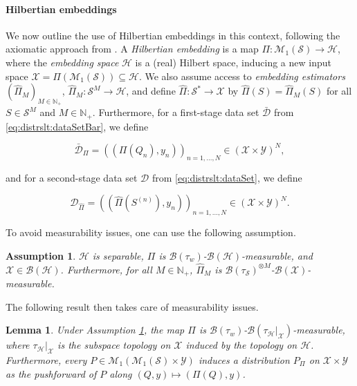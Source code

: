 \documentclass[letterpaper]{article} %
\newcommand{\Np}{\mathbb{N}_+}
\newcommand{\Borel}{\mathcal{B}} %
\newcommand{\hs}[1]{\mathcal{#1}} %
\newcommand{\samplingSet}{\mathcal{S}} %
\newcommand{\inputSet}{\mathcal{X}} %
\newcommand{\outputSet}{\mathcal{Y}} %
\newcommand{\dataSet}{\mathcal{D}}
\newcommand{\dataSetBar}{\bar{\dataSet}}
\newcommand{\distributions}{\mathcal{M}_1} %
\newcommand{\hilbertianHS}{\hs{H}} %
\newcommand{\hilbertianEmbed}{\Pi} %
\newcommand{\defm}[1]{\emph{#1}}
\newtheorem{lemma}[theorem]{Lemma}
\newtheorem{assumption}[theorem]{Assumption}
\newif\ifNotMuchSpace
\begin{document}
\paragraph{Hilbertian embeddings}
We now outline the use of Hilbertian embeddings in this context, following the axiomatic approach from \cite{fiedler2024statistical}.
A \defm{Hilbertian embedding} is a map  $\hilbertianEmbed: \distributions(\samplingSet) \rightarrow \hilbertianHS$,
where the \defm{embedding space } $\hilbertianHS$ is a (real) Hilbert space,
inducing a new input space $\inputSet=\hilbertianEmbed(\distributions(\samplingSet))\subseteq\hilbertianHS$.
We also assume access to \defm{embedding estimators} $(\hat\hilbertianEmbed_M)_{M\in\Np}$, $\hat\hilbertianEmbed_M: \samplingSet^M \rightarrow \hilbertianHS$,
and define $\hat\hilbertianEmbed: \samplingSet^\ast \rightarrow \inputSet$  by $\hat\hilbertianEmbed(S)=\hat\hilbertianEmbed_M(S)$ for all $S\in\samplingSet^M$ and $M\in\Np$.
Furthermore, for a first-stage data set $\dataSetBar$ from \eqref{eq:distrslt:dataSetBar}, we define
\ifNotMuchSpace
$\dataSetBar_\hilbertianEmbed = \big((\hilbertianEmbed (Q_n), y_n)\big)_{n=1,\ldots,N} \in (\inputSet\times\outputSet)^N$,
\else
\begin{equation*}
     \dataSetBar_\hilbertianEmbed = \left((\hilbertianEmbed (Q_n), y_n)\right)_{n=1,\ldots,N} \in (\inputSet\times\outputSet)^N,
\end{equation*}
\fi
and for a second-stage data set $\dataSet$ from \eqref{eq:distrslt:dataSet}, we define
\ifNotMuchSpace
$\dataSet_{\hat\hilbertianEmbed} = \big((\hat\hilbertianEmbed(S^{(n)}),y_n)\big)_{n=1,\ldots,N}$.
\else
\begin{equation*}
     \dataSet_{\hat\hilbertianEmbed} = \left((\hat\hilbertianEmbed(S^{(n)}),y_n)\right)_{n=1,\ldots,N} \in (\inputSet\times\outputSet)^N.
\end{equation*}
\fi
To avoid measurability issues, one can use the following assumption.
\begin{assumption}\label{assumption:distrslt:sufficientConditionMeasurability}
$\hilbertianHS$ is separable, 
$\hilbertianEmbed$ is $\Borel(\tau_{w})$-$\Borel(\hilbertianHS)$-measurable, 
and $\inputSet\in\Borel(\hilbertianHS)$.
Furthermore, for all $M\in\Np$, $\hat\hilbertianEmbed_M$ is $\Borel(\tau_\samplingSet)^{\otimes M}$-$\Borel(\inputSet)$-measurable.
\end{assumption}
The following result then takes care of measurability issues.
\begin{lemma} \label{lem:distrslt:measurability}
Under Assumption \ref{assumption:distrslt:sufficientConditionMeasurability}, the map $\hilbertianEmbed$ is $\Borel(\tau_w)$-$\Borel(\tau_\hilbertianHS\lvert_{\inputSet})$-measurable, where $\tau_\hilbertianHS\lvert_{\inputSet}$ is the subspace topology on $\inputSet$ induced by the topology on $\hilbertianHS$.
Furthermore, every $P\in\distributions(\distributions(\samplingSet)\times\outputSet)$ induces a distribution $P_\hilbertianEmbed$ on $\inputSet\times\outputSet$ 
as the pushforward
of $P$ along $(Q,y)\mapsto(\hilbertianEmbed (Q), y)$.
\end{lemma}
\end{document}
